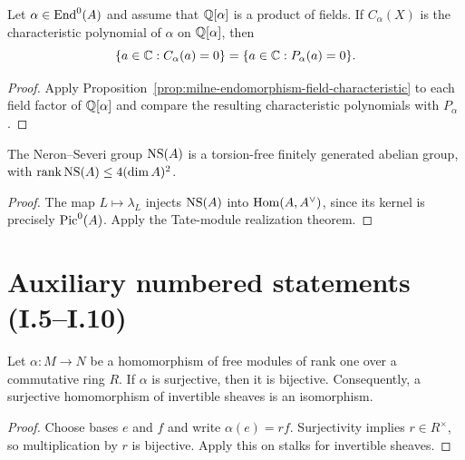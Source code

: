 \begin{corollary}
\label{cor:milne-characteristic-polynomial-roots}

Let $\alpha\in\operatorname{End}^0(A)$ and assume that $\mathbb{Q}[\alpha]$ is a product of fields.
If $C_\alpha(X)$ is the characteristic polynomial of $\alpha$ on $\mathbb{Q}[\alpha]$,
then
\[
\{a\in\mathbb{C}:C_\alpha(a)=0\}=\{a\in\mathbb{C}:P_\alpha(a)=0\}.
\]
\end{corollary}

\begin{proof}
Apply Proposition~\ref{prop:milne-endomorphism-field-characteristic} to
each field factor of $\mathbb{Q}[\alpha]$ and compare the resulting characteristic
polynomials with $P_\alpha$.
\end{proof}

\begin{corollary}
\label{cor:milne-ns-finite-rank}

The Neron--Severi group $\operatorname{NS}(A)$ is a torsion-free finitely generated abelian
group, with
$\operatorname{rank}\operatorname{NS}(A)\leq 4(\dim A)^2$.
\end{corollary}

\begin{proof}
The map $L\mapsto\lambda_L$ injects $\operatorname{NS}(A)$ into
$\operatorname{Hom}(A,A^\vee)$, since its kernel is precisely $\operatorname{Pic}^0(A)$.  Apply the
Tate-module realization theorem.
\end{proof}


\section*{Auxiliary numbered statements (I.5--I.10)}

\begin{lemma}
\label{lem:milne-5-8}

Let $\alpha:M\to N$ be a homomorphism of free modules of rank one over a
commutative ring $R$.  If $\alpha$ is surjective, then it is bijective.
Consequently, a surjective homomorphism of invertible sheaves is an
isomorphism.
\end{lemma}

\begin{proof}

Choose bases $e$ and $f$ and write $\alpha(e)=rf$.  Surjectivity implies
$r\in R^\times$, so multiplication by $r$ is bijective.  Apply this on
stalks for invertible sheaves.

\end{proof}


